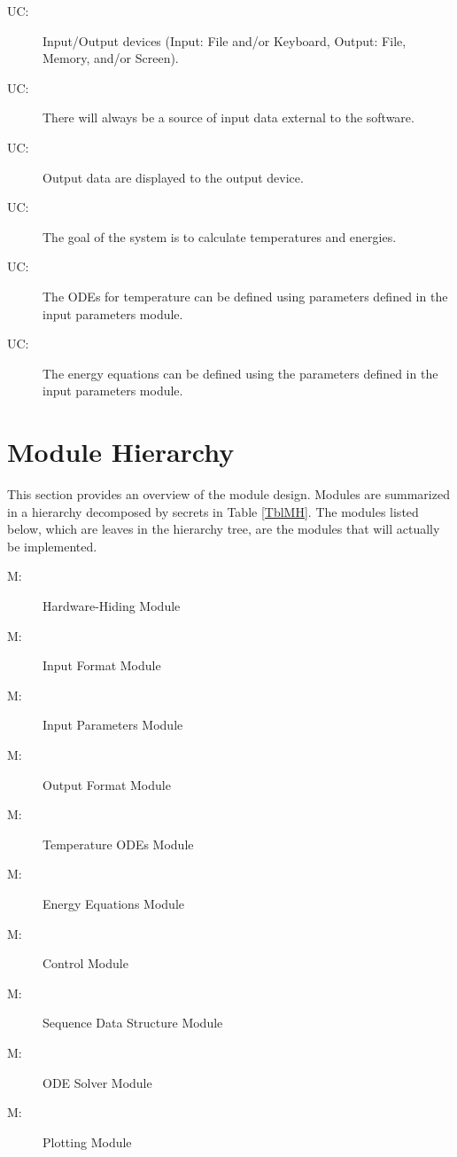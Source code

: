 \documentclass[12pt]{article}
\newcounter{ucnum}
\newcommand{\uctheucnum}{UC\theucnum}
\newcounter{mnum}
\newcommand{\mthemnum}{M\themnum}
\begin{document}
\begin{description}
\item[ \uctheucnum \label{ucIO}:] Input/Output devices
  (Input: File and/or Keyboard, Output: File, Memory, and/or Screen).
\item[ \uctheucnum \label{ucInput}:] There will always be
  a source of input data external to the software.
\item[ \uctheucnum \label{ucOutput}:] Output data are
  displayed to the output device.
\item[ \uctheucnum \label{ucGoal}:] The goal of the system
  is to calculate temperatures and energies.
\item[ \uctheucnum \label{ucODEstructure}:] The ODEs for
  temperature can be defined using parameters defined in the input parameters module.
\item[ \uctheucnum \label{ucEnergyStructure}:] The energy
  equations can be defined using the parameters defined in the input parameters module.
\end{description}

\section{Module Hierarchy} \label{SecMH}

This section provides an overview of the module design. Modules are summarized
in a hierarchy decomposed by secrets in Table \ref{TblMH}. The modules listed
below, which are leaves in the hierarchy tree, are the modules that will
actually be implemented.

\begin{description}
\item [ \mthemnum \label{mHH}:] Hardware-Hiding Module
\item [ \mthemnum \label{mInput}:] Input Format Module
\item [ \mthemnum \label{mParams}:] Input Parameters Module
\item [ \mthemnum \label{mOutput}:] Output Format Module
\item [ \mthemnum \label{mODEs}:] Temperature ODEs Module
\item [ \mthemnum \label{mEnergy}:] Energy Equations Module
\item [ \mthemnum \label{mControl}:] Control Module
\item [ \mthemnum \label{mSeqDS}:] Sequence Data Structure Module
\item [ \mthemnum \label{mSolver}:] ODE Solver Module
\item [ \mthemnum \label{mPlot}:] Plotting Module
\end{description}
\end{document}
